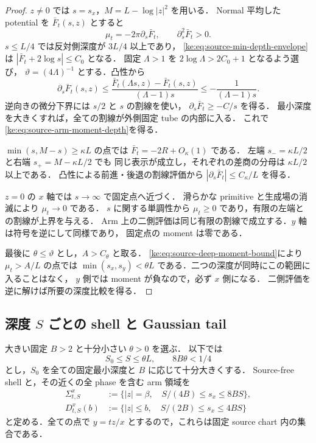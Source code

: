 \begin{proof}
$z\ne0$ では $s=s_x$，$M=L-\log|z|^2$ を用いる．
Normal 平均した potential を $\bar F_t(s,z)$ とすると
\[
 \mu_t=-2\pi\partial_s\bar F_t,\qquad
 \partial_s^2\bar F_t>0.
\]
$s\le L/4$ では反対側深度が $3L/4$ 以上であり，
\eqref{ke:eq:source-min-depth-envelope}は
$|\bar F_t+2\log s|\le C_0$ となる．
固定 $\Lambda>1$ を $2\log\Lambda>2C_0+1$ となるよう選び，
$\vartheta=(4\Lambda)^{-1}$ とする．凸性から
\[
 \partial_s\bar F_t(s,z)
 \le\frac{\bar F_t(\Lambda s,z)-\bar F_t(s,z)}{(\Lambda-1)s}
 \le-\frac1{(\Lambda-1)s}.
\]
逆向きの微分下界には $s/2$ と $s$ の割線を使い，
$\partial_s\bar F_t\ge-C/s$ を得る．
最小深度を大きくすれば，全ての割線が外側固定 tube の内部に入る．
これで\eqref{ke:eq:source-arm-moment-depth}を得る．

$\min(s,M-s)\ge\kappa L$ の点では
$\bar F_t=-2R+O_\kappa(1)$ である．
左端 $s_-=\kappa L/2$ と右端 $s_+=M-\kappa L/2$ でも
同じ表示が成立し，それぞれの差商の分母は $\kappa L/2$ 以上である．
凸性による前進・後退の割線評価から
$|\partial_s\bar F_t|\le C_\kappa/L$ を得る．

$z=0$ の $x$ 軸では $s\to\infty$ で固定点へ近づく．
滑らかな primitive と生成場の消滅により $\mu_t\to0$ である．
$s$ に関する単調性から $\mu_t\ge0$ であり，有限の左端との割線が上界を与える．
Arm 上の二側評価は同じ有限の割線で成立する．$y$ 軸は符号を逆にして同様であり，
固定点の moment は零である．

最後に $\theta\le\vartheta$ とし，$A>C_\theta$ と取る．
\eqref{ke:eq:source-deep-moment-bound}により $\mu_t>A/L$ の点では
$\min(s_x,s_y)<\theta L$ である．二つの深度が同時にこの範囲に入ることはなく，
$y$ 側では moment が負なので，必ず $x$ 側になる．
二側評価を逆に解けば所要の深度比較を得る．
\end{proof}

\subsection{深度 $S$ ごとの shell と Gaussian tail}

大きい固定 $B>2$ と十分小さい $\theta>0$ を選ぶ．
以下では
\begin{equation}\label{ke:eq:source-arm-scale-range}
 S_0\le S\le\theta L,\qquad 8B\theta<1/4
\end{equation}
とし，$S_0$ を全ての固定最小深度と $B$ に応じて十分大きくする．
Source-free shell と，その近くの全 phase を含む arm 領域を
\[
 \begin{split}
 \Sigma^x_{t,S}
   &:=\{|z|=\beta,\quad S/(4B)\le s_x\le8BS\},\\
 D^x_{t,S}(b)
   &:=\{|z|\le b,\quad S/(2B)\le s_x\le4BS\}
 \end{split}
\]
と定める．全ての点で $y=tz/x$ とするので，これらは固定 source chart 内の集合である．

